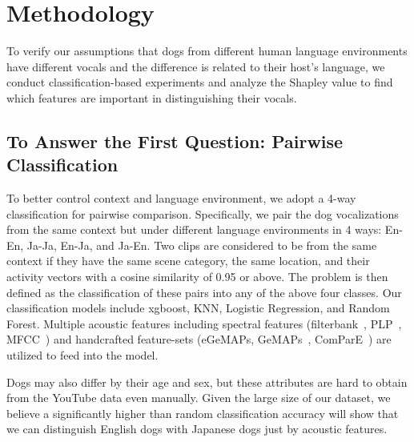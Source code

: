 \section{Methodology}
\label{sec:method}
To verify our assumptions that dogs from different human language environments have different vocals and the difference is related to their host's language, we conduct classification-based experiments and analyze the Shapley value to find which features are important in distinguishing their vocals. %

\subsection{To Answer the First Question: Pairwise Classification}


To better control context and language environment, we adopt a 4-way classification for pairwise comparison. Specifically, we pair the dog vocalizations from the same context but under different language environments in 4 ways: En-En, Ja-Ja, En-Ja, and Ja-En. Two clips are considered to be from the same context if they have the same scene category, the same location, and their activity vectors with a cosine similarity of 0.95 or above. The problem is then defined as the classification of these pairs into any of the above four classes. Our classification models include xgboost, KNN, Logistic Regression, and Random Forest. Multiple acoustic features including spectral features (filterbank~\cite{strang1996wavelets}, PLP~\cite{hermansky1990perceptual}, MFCC~\cite{davis1980comparison}) and handcrafted feature-sets (eGeMAPs, GeMAPs~\cite{eyben2015geneva}, ComParE~\cite{schuller2013interspeech}) are utilized to feed into the model. 

Dogs may also differ by their
age and sex, but these attributes are hard to obtain from the YouTube data even manually.
Given the large size of our dataset, we believe a significantly higher than random classification
accuracy will show that we can distinguish English dogs with Japanese dogs just 
by acoustic features.  

